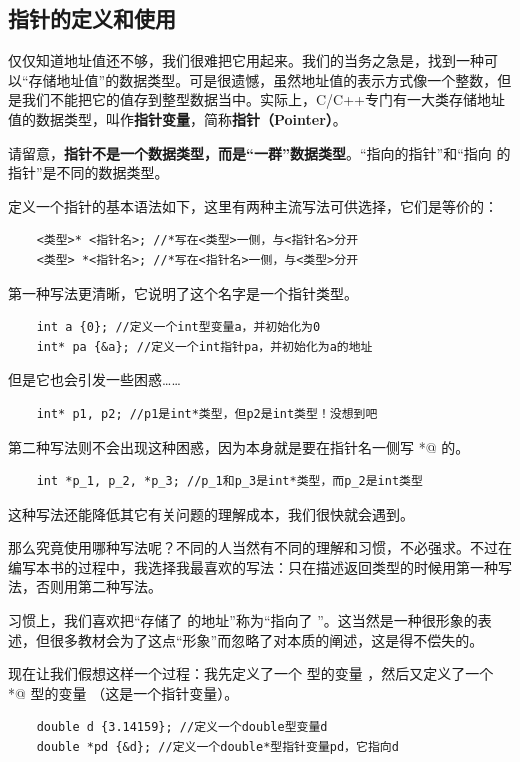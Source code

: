 \subsection*{指针的定义和使用}
仅仅知道地址值还不够，我们很难把它用起来。我们的当务之急是，找到一种可以``存储地址值''的数据类型。可是很遗憾，虽然地址值的表示方式像一个整数，但是我们不能把它的值存到整型数据当中。实际上，C/C++专门有一大类存储地址值的数据类型，叫作\textbf{指针变量}，简称\textbf{指针（Pointer）}。\par
请留意，\textbf{指针不是一个数据类型，而是``一群''数据类型}。``指向\lstinline@int@ 的指针''和``指向 \lstinline@double@ 的指针''是不同的数据类型。\par
定义一个指针的基本语法如下，这里有两种主流写法可供选择，它们是等价的：
\begin{lstlisting}
    <类型>* <指针名>; //*写在<类型>一侧，与<指针名>分开
    <类型> *<指针名>; //*写在<指针名>一侧，与<类型>分开
\end{lstlisting}\par
第一种写法更清晰，它说明了这个名字是一个指针类型。
\begin{lstlisting}
    int a {0}; //定义一个int型变量a，并初始化为0
    int* pa {&a}; //定义一个int指针pa，并初始化为a的地址
\end{lstlisting}
但是它也会引发一些困惑……
\begin{lstlisting}
    int* p1, p2; //p1是int*类型，但p2是int类型！没想到吧
\end{lstlisting}\par
第二种写法则不会出现这种困惑，因为本身就是要在指针名一侧写 \lstinline@*@ 的。
\begin{lstlisting}
    int *p_1, p_2, *p_3; //p_1和p_3是int*类型，而p_2是int类型
\end{lstlisting}
这种写法还能降低其它有关问题的理解成本，我们很快就会遇到。\par
那么究竟使用哪种写法呢？不同的人当然有不同的理解和习惯，不必强求。不过在编写本书的过程中，我选择我最喜欢的写法：只在描述返回类型的时候用第一种写法，否则用第二种写法。\par
习惯上，我们喜欢把``\lstinline@p@ 存储了 \lstinline@a@ 的地址''称为``\lstinline@p@ 指向了 \lstinline@a@''。这当然是一种很形象的表述，但很多教材会为了这点``形象''而忽略了对本质的阐述，这是得不偿失的。\par
现在让我们假想这样一个过程：我先定义了一个 \lstinline@double@ 型的变量 \lstinline@d@，然后又定义了一个 \lstinline@double*@ 型的变量 \lstinline@pd@（这是一个指针变量）。
\begin{lstlisting}
    double d {3.14159}; //定义一个double型变量d
    double *pd {&d}; //定义一个double*型指针变量pd，它指向d
\end{lstlisting}
